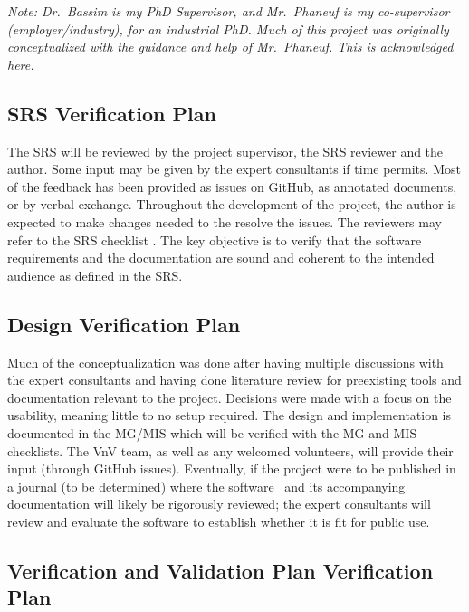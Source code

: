 \documentclass[12pt, titlepage]{article}
\begin{document}
\noindent \textit{\small{Note: Dr.~Bassim is my PhD Supervisor, and Mr.~Phaneuf
is my co-supervisor (employer/industry), for an industrial PhD.
Much of this project was originally conceptualized with 
the guidance and help of Mr.~Phaneuf.
This is acknowledged here.}}


\subsection{SRS Verification Plan} \label{sec_srs_vplan}

The SRS will be reviewed by the project supervisor, the SRS reviewer and the author. Some input
may be given by the expert consultants if time permits. Most of the feedback has been provided 
as issues on GitHub, as annotated documents, or by verbal exchange. 
Throughout the development of the project, the author is expected 
to make changes needed to the resolve the issues. The reviewers may refer to the SRS checklist \citep{SRS_checklist}.
The key objective is to verify that the software requirements and the documentation are sound 
and coherent to the intended audience as defined in the SRS.


\subsection{Design Verification Plan} \label{sec_design_vplan}

Much of the conceptualization was done after having multiple discussions with the expert 
consultants and having done literature review for preexisting tools and documentation 
relevant to the project. Decisions were made with a focus on the usability, meaning little to 
no setup required. The design and implementation is documented in the 
MG\citep{MG}/MIS\citep{MIS} which will be verified with the MG \cite{MG_checklist}
and MIS \cite{MIS_checklist} checklists.
The VnV team, as well as any welcomed volunteers, will provide
their input (through GitHub issues). Eventually, if the project were to be published
in a journal (to be determined) where the software \progname~and its
accompanying documentation will likely be rigorously reviewed; the expert
consultants will review and evaluate the software to
establish whether it is fit for public use.


\subsection{Verification and Validation Plan Verification Plan}
\end{document}
